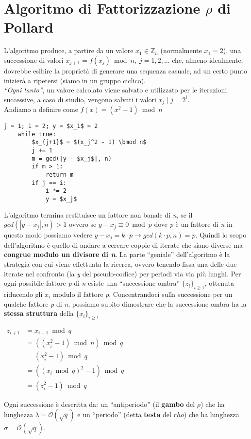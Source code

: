 \newpage
\section{Algoritmo di Fattorizzazione $\rho$ di Pollard}
L'algoritmo produce, a partire da un valore $x_1 \in \mathbb{Z}_n$ (normalmente $x_1 = 2$), una successione di valori $x_{j+1} = f(x_j) \bmod n, \; j = {1, 2, ...}$ che, almeno idealmente, dovrebbe esibire la proprietà di generare una sequenza casuale, ad un certo punto inizierà a ripetersi (siamo in un gruppo ciclico). \\
\textit{``Ogni tanto''}, un valore calcolato viene salvato e utilizzato per le iterazioni successive, a caso di studio, vengono salvati i valori $x_j \; | \; j = 2^i$. \\
Andiamo a definire come $f(x) = (x^2 - 1) \bmod n$
\begin{lstlisting}[label=lst:rho-polland, basicstyle=\small, mathescape=true]
    j = 1; i = 2; y = $x_1$ = 2
    while true:
        $x_{j+1}$ = $(x_j^2 - 1) \bmod n$
        j += 1
        m = gcd(|y - $x_j$|, n)
        if m > 1:
            return m
        if j == i:
            i *= 2
            y = $x_j$
\end{lstlisting}
L'algoritmo termina restituisce un fattore non banale di \textit{n}, se il $gcd(|y - x_j|, n) > 1$ ovvero se $y - x_j \equiv 0 \bmod p$ dove \textit{p} è un fattore di \textit{n} in questo modo possiamo vedere $y - x_j = k \cdot p \rightarrow gcd(k \cdot p, n) = p$. Quindi lo scopo dell'algoritmo è quello di andare a cercare coppie di iterate che siano diverse ma \textbf{congrue modulo un divisore di \textit{n}}. La parte ``geniale'' dell'algoritmo è la strategia con cui viene effettuata la ricerca, ovvero tenendo fissa una delle due iterate nel confronto (la \textit{y} del pseudo-codice) per periodi via via più lunghi. Per ogni possibile fattore \textit{p} di \textit{n} esiste una ``successione ombra'' $\{z_i\}_{i \geq 1}$, ottenuta riducendo gli $x_i$ modulo il fattore \textit{p}. Concentrandoci sulla successione per un qualche fattore \textit{p} di \textit{n}, possiamo subito dimostrare che la successione ombra ha la \textbf{stessa struttura} della $\{x_i\}_{i \geq 1}$
\begin{center}
    \begin{math}
        \begin{aligned}
            z_{i + 1} &= x_{i + 1} \bmod q\\
            &= ((x_i^2 - 1) \bmod n) \bmod q\\
            &= (x_i^2 - 1) \bmod q\\
            &= ((x_i \bmod q)^2 - 1) \bmod q\\
            &= (z_i^2 - 1) \bmod q
        \end{aligned}
    \end{math}
\end{center}
Ogni successione è descritta da: un ``antiperiodo'' (il \textbf{gambo} del $\rho$) che ha lunghezza $\lambda = \mathcal{O}(\sqrt{q})$ e un ``periodo'' (detta \textbf{testa} del $rho$) che ha lunghezza $\sigma = \mathcal{O}(\sqrt{q})$.

